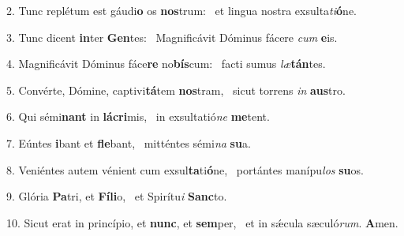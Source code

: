 2. Tunc replétum est gáudi\textbf{o} os \textbf{nos}trum: \ast\  et lingua nostra exsulta\textit{ti}\textbf{ó}ne.\

3. Tunc dicent \textbf{in}ter \textbf{Gen}tes: \ast\  Magnificávit Dóminus fácere \textit{cum} \textbf{e}is.\

4. Magnificávit Dóminus fáce\textbf{re} no\textbf{bís}cum: \ast\  facti sumus \textit{læ}\textbf{tán}tes.\

5. Convérte, Dómine, captivi\textbf{tá}tem \textbf{nos}tram, \ast\  sicut torrens \textit{in} \textbf{aus}tro.\

6. Qui sémi\textbf{nant} in \textbf{lá}\textbf{cri}mis, \ast\  in exsultatió\textit{ne} \textbf{me}tent.\

7. Eúntes \textbf{i}bant et \textbf{fle}bant, \ast\  mitténtes sémi\textit{na} \textbf{su}a.\

8. Veniéntes autem vénient cum exsul\textbf{ta}ti\textbf{ó}ne, \ast\  portántes manípu\textit{los} \textbf{su}os.\

9. Glória \textbf{Pa}tri, et \textbf{Fí}\textbf{li}o, \ast\  et Spirítu\textit{i} \textbf{Sanc}to.\

10. Sicut erat in princípio, et \textbf{nunc}, et \textbf{sem}per, \ast\  et in sǽcula sæculó\textit{rum}. \textbf{A}men.\

